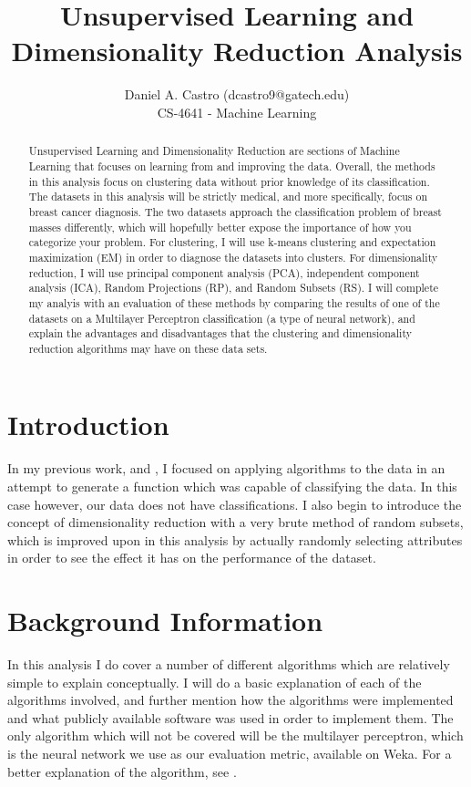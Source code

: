 \documentclass[annual]{acmsiggraph}
\title{Unsupervised Learning and Dimensionality Reduction Analysis}
\author{Daniel A. Castro (dcastro9@gatech.edu) \\ CS-4641 - Machine Learning}
\begin{document}
\maketitle

\begin{abstract}
Unsupervised Learning and Dimensionality Reduction are sections of Machine Learning that focuses on learning from and improving the data.  Overall, the methods in this analysis focus on clustering data without prior knowledge of its classification. The datasets in this analysis will be strictly medical, and more specifically, focus on breast cancer diagnosis. The two datasets approach the classification problem of breast masses differently, which will hopefully better expose the importance of how you categorize your problem. For clustering, I will use k-means clustering and expectation maximization (EM) in order to diagnose the datasets into clusters. For dimensionality reduction, I will use principal component analysis (PCA), independent component analysis (ICA), Random Projections (RP), and Random Subsets (RS). I will complete my analyis with an evaluation of these methods by comparing the results of one of the datasets on a Multilayer Perceptron classification (a type of neural network), and explain the advantages and disadvantages that the clustering and dimensionality reduction algorithms may have on these data sets.
\end{abstract}

\section{Introduction}
In my previous work, \cite{Castro1:2013} and \cite{Castro2:2013}, I focused on applying algorithms to the data in an attempt to generate a function which was capable of classifying the data. In this case however, our data does not have classifications. I also begin to introduce the concept of dimensionality reduction with a very brute method of random subsets, which is improved upon in this analysis by actually randomly selecting attributes in order to see the effect it has on the performance of the dataset.
\section{Background Information}
In this analysis I do cover a number of different algorithms which are relatively simple to explain conceptually. I will do a basic explanation of each of the algorithms involved, and further mention how the algorithms were implemented and what publicly available software was used in order to implement them. The only algorithm which will not be covered will be the multilayer perceptron, which is the neural network we use as our evaluation metric, available on Weka. For a better explanation of the algorithm, see \cite{Castro1:2013}.
\end{document}
